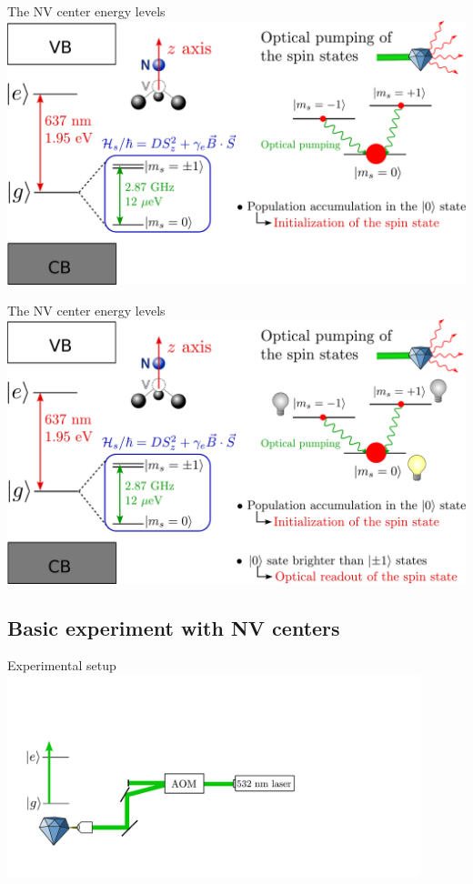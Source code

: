 \documentclass{beamer}
\begin{document}
\begin{frame}{The NV center energy levels}
\centering
\includegraphics[width=\textwidth,height=0.85\textheight,keepaspectratio]{Slide_NV_levels_1}
\end{frame}

\begin{frame}{The NV center energy levels}
\centering
\includegraphics[width=\textwidth,height=0.85\textheight,keepaspectratio]{Slide_NV_levels}
\end{frame}

\subsection{Basic experiment with NV centers}
\begin{frame}{Experimental setup}
\centering
\includegraphics[width=0.9\textwidth,height=0.85\textheight,keepaspectratio]{Slide_setup_-4}
\end{frame}
\end{document}
